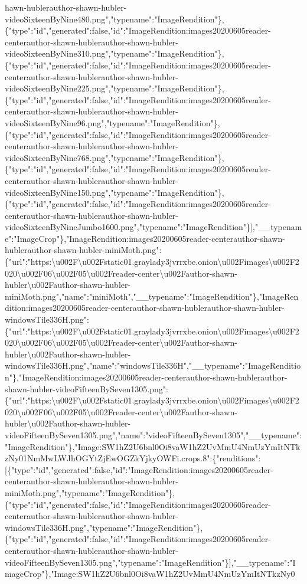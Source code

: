 hawn-hublerauthor-shawn-hubler-videoSixteenByNine480.png","typename":"ImageRendition"\},\{"type":"id","generated":false,"id":"ImageRendition:images20200605reader-centerauthor-shawn-hublerauthor-shawn-hubler-videoSixteenByNine310.png","typename":"ImageRendition"\},\{"type":"id","generated":false,"id":"ImageRendition:images20200605reader-centerauthor-shawn-hublerauthor-shawn-hubler-videoSixteenByNine225.png","typename":"ImageRendition"\},\{"type":"id","generated":false,"id":"ImageRendition:images20200605reader-centerauthor-shawn-hublerauthor-shawn-hubler-videoSixteenByNine96.png","typename":"ImageRendition"\},\{"type":"id","generated":false,"id":"ImageRendition:images20200605reader-centerauthor-shawn-hublerauthor-shawn-hubler-videoSixteenByNine768.png","typename":"ImageRendition"\},\{"type":"id","generated":false,"id":"ImageRendition:images20200605reader-centerauthor-shawn-hublerauthor-shawn-hubler-videoSixteenByNine150.png","typename":"ImageRendition"\},\{"type":"id","generated":false,"id":"ImageRendition:images20200605reader-centerauthor-shawn-hublerauthor-shawn-hubler-videoSixteenByNineJumbo1600.png","typename":"ImageRendition"\}{]},"\_\_typename":"ImageCrop"\},"ImageRendition:images20200605reader-centerauthor-shawn-hublerauthor-shawn-hubler-miniMoth.png":\{"url":"https:\textbackslash{}u002F\textbackslash{}u002Fstatic01.graylady3jvrrxbe.onion\textbackslash{}u002Fimages\textbackslash{}u002F2020\textbackslash{}u002F06\textbackslash{}u002F05\textbackslash{}u002Freader-center\textbackslash{}u002Fauthor-shawn-hubler\textbackslash{}u002Fauthor-shawn-hubler-miniMoth.png","name":"miniMoth","\_\_typename":"ImageRendition"\},"ImageRendition:images20200605reader-centerauthor-shawn-hublerauthor-shawn-hubler-windowsTile336H.png":\{"url":"https:\textbackslash{}u002F\textbackslash{}u002Fstatic01.graylady3jvrrxbe.onion\textbackslash{}u002Fimages\textbackslash{}u002F2020\textbackslash{}u002F06\textbackslash{}u002F05\textbackslash{}u002Freader-center\textbackslash{}u002Fauthor-shawn-hubler\textbackslash{}u002Fauthor-shawn-hubler-windowsTile336H.png","name":"windowsTile336H","\_\_typename":"ImageRendition"\},"ImageRendition:images20200605reader-centerauthor-shawn-hublerauthor-shawn-hubler-videoFifteenBySeven1305.png":\{"url":"https:\textbackslash{}u002F\textbackslash{}u002Fstatic01.graylady3jvrrxbe.onion\textbackslash{}u002Fimages\textbackslash{}u002F2020\textbackslash{}u002F06\textbackslash{}u002F05\textbackslash{}u002Freader-center\textbackslash{}u002Fauthor-shawn-hubler\textbackslash{}u002Fauthor-shawn-hubler-videoFifteenBySeven1305.png","name":"videoFifteenBySeven1305","\_\_typename":"ImageRendition"\},"Image:SW1hZ2U6bnl0Oi8vaW1hZ2UvMmU4NmUzYmItNTkzNy01NmMwLWJhOGYtZjEwOGZkYjkyOWFi.crops.8":\{"renditions":{[}\{"type":"id","generated":false,"id":"ImageRendition:images20200605reader-centerauthor-shawn-hublerauthor-shawn-hubler-miniMoth.png","typename":"ImageRendition"\},\{"type":"id","generated":false,"id":"ImageRendition:images20200605reader-centerauthor-shawn-hublerauthor-shawn-hubler-windowsTile336H.png","typename":"ImageRendition"\},\{"type":"id","generated":false,"id":"ImageRendition:images20200605reader-centerauthor-shawn-hublerauthor-shawn-hubler-videoFifteenBySeven1305.png","typename":"ImageRendition"\}{]},"\_\_typename":"ImageCrop"\},"Image:SW1hZ2U6bnl0Oi8vaW1hZ2UvMmU4NmUzYmItNTkzNy0